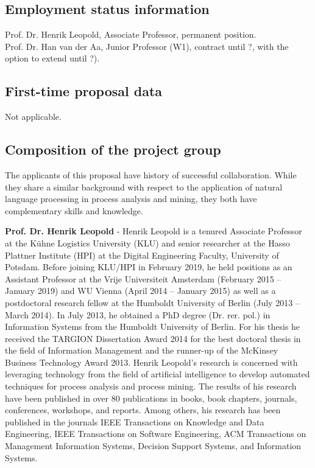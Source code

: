 

\subsection{Employment status information}

Prof. Dr. Henrik Leopold, Associate Professor, permanent position.\\
Prof. Dr. Han van der Aa, Junior Professor (W1), contract until ?, with the option to extend until ?).


\subsection{First-time proposal data}

Not applicable.

\subsection{Composition of the project group}

The applicants of this proposal have history of successful collaboration. While they share a similar background with respect to the application of natural language processing in process analysis and mining, they both have complementary skills and knowledge. 

\textbf{Prof. Dr. Henrik Leopold} - Henrik Leopold is a tenured Associate Professor at the K\"uhne Logistics University (KLU) and senior researcher at the Hasso Plattner Institute (HPI) at the Digital Engineering Faculty, University of Potsdam. Before joining KLU/HPI in February 2019, he held positions as an Assistant Professor at the Vrije Universiteit Amsterdam (February 2015 – January 2019) and WU Vienna (April 2014 – January 2015) as well as a postdoctoral research fellow at the Humboldt University of Berlin (July 2013 – March 2014). In July 2013, he obtained a PhD degree (Dr. rer. pol.) in Information Systems from the Humboldt University of Berlin. For his thesis he received the TARGION Dissertation Award 2014 for the best doctoral thesis in the field of Information Management and the runner-up of the McKinsey Business Technology Award 2013. Henrik Leopold's research is concerned with leveraging technology from the field of artificial intelligence to develop automated techniques for process analysis and process mining. The results of his research have been published in over 80 publications in books, book chapters, journals, conferences, workshops, and reports. Among others, his research has been published in the journals IEEE Transactions on Knowledge and Data Engineering, IEEE Transactions on Software Engineering, ACM Transactions on Management Information Systems, Decision Support Systems, and Information Systems. 

